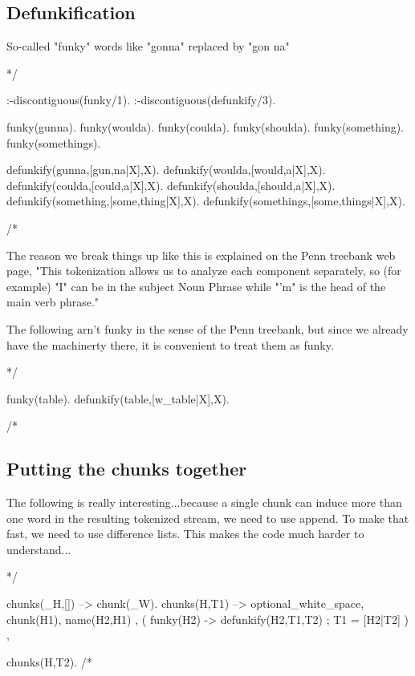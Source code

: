 \documentclass{book}[9pt]
\newenvironment{code}%
{\small \verbatim}%
{\endverbatim \large}
\begin{document}
\subsection{Defunkification}

So-called "funky" words like "gonna" replaced by  "gon na"

\begin{code}
*/

:-discontiguous(funky/1).
:-discontiguous(defunkify/3).

funky(gunna).
funky(woulda).
funky(coulda).
funky(shoulda).
funky(something).
funky(somethings).

defunkify(gunna,[gun,na|X],X).
defunkify(woulda,[would,a|X],X).
defunkify(coulda,[could,a|X],X).
defunkify(shoulda,[should,a|X],X).
defunkify(something,[some,thing|X],X).
defunkify(somethings,[some,things|X],X).

/*      
\end{code}

\noindent The reason we break things up like this is explained on the Penn
treebank web page, "This tokenization allows us to analyze each component
separately, so (for example) "I" can be in the subject Noun Phrase while "'m"
is the head of the main verb phrase."

The following arn't funky in the sense of the Penn treebank, but since we
already have the machinerty there, it is convenient to treat them as funky.

\begin{code}
*/

funky(table).
defunkify(table,[w_table|X],X).

/*
\end{code}

\subsection{Putting the chunks together}

The following is really interesting...because a single chunk can
induce more than one word in the resulting tokenized stream, we need
to use append.  To make that fast, we need to use difference lists.
This makes the code much harder to understand...

\begin{code}
*/

chunks(_H,[]) --> \+ chunk(_W).
chunks(H,T1) -->
        optional_white_space,
        chunk(H1),
        { name(H2,H1) },
        { ( funky(H2) ->
              defunkify(H2,T1,T2)
          ;
              T1 = [H2|T2]
          )
        },
        
        chunks(H,T2).
/*
\end{code}
\end{document}
